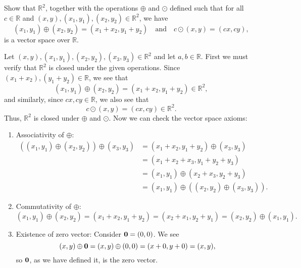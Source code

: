 \begin{exmp}
Show that $ \mathbb{R}^2 $, together with the operations $ \oplus $ and $ \odot $ defined such that for all $ c\in\mathbb{R} $ and $ (x,y),(x_1,y_1),(x_2,y_2)\in\mathbb{R}^2 $, we have
\begin{equation*}
    (x_1,y_1)\oplus(x_2,y_2)=(x_1+x_2,y_1+y_2) \quad\text{and}\quad c\odot(x,y)=(cx,cy),
\end{equation*}
is a vector space over $ \mathbb{R} $.
\end{exmp}
\begin{sltn}
Let $ (x,y),(x_1,y_1),(x_2,y_2),(x_3,y_3)\in\mathbb{R}^2 $ and let $ a,b\in\mathbb{R} $. First we must verify that $ \mathbb{R}^2 $ is closed under the given operations. Since $ (x_1+x_2),(y_1+y_2)\in\mathbb{R} $, we see that
\begin{equation*}
    (x_1,y_1)\oplus(x_2,y_2)=(x_1+x_2,y_1+y_2)\in\mathbb{R}^2,
\end{equation*}
and similarly, since $ cx,cy\in\mathbb{R} $, we also see that
\begin{equation*}
    c\odot(x,y)=(cx,cy)\in\mathbb{R}^2.
\end{equation*}
Thus, $ \mathbb{R}^2 $ is closed under $ \oplus $ and $ \odot $. Now we can check the vector space axioms:
\begin{enumerate}
    \item Associativity of $ \oplus $:
    \begin{align*}
        ((x_1,y_1)\oplus(x_2,y_2))\oplus(x_3,y_3) &= (x_1+x_2,y_1+y_2)\oplus(x_3,y_3) \\
        &= (x_1+x_2+x_3,y_1+y_2+y_3) \\
        &= (x_1,y_1)\oplus(x_2+x_3,y_2+y_3) \\
        &= (x_1,y_1)\oplus((x_2,y_2)\oplus(x_3,y_3)).
    \end{align*}

    \item Commutativity of $ \oplus $:
    \begin{equation*}
        (x_1,y_1)\oplus(x_2,y_2)=(x_1+x_2,y_1+y_2)=(x_2+x_1,y_2+y_1)=(x_2,y_2)\oplus(x_1,y_1).
    \end{equation*}

    \item Existence of zero vector: Consider $ \mathbf{0}=(0,0) $. We see
    \begin{equation*}
        (x,y)\oplus\mathbf{0}=(x,y)\oplus(0,0)=(x+0,y+0)=(x,y),
    \end{equation*}
    so $ \mathbf{0} $, as we have defined it, is the zero vector.


\end{enumerate}
\end{sltn}
